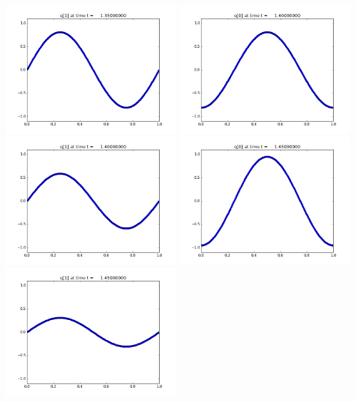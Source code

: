 \documentclass[11pt]{article}
\begin{document}
\includegraphics[width=0.475\textwidth]{frame0027fig1.png}
\vskip 10pt 
\includegraphics[width=0.475\textwidth]{frame0028fig0.png}
\includegraphics[width=0.475\textwidth]{frame0028fig1.png}
\vskip 10pt 
\includegraphics[width=0.475\textwidth]{frame0029fig0.png}
\includegraphics[width=0.475\textwidth]{frame0029fig1.png}
\end{document}
